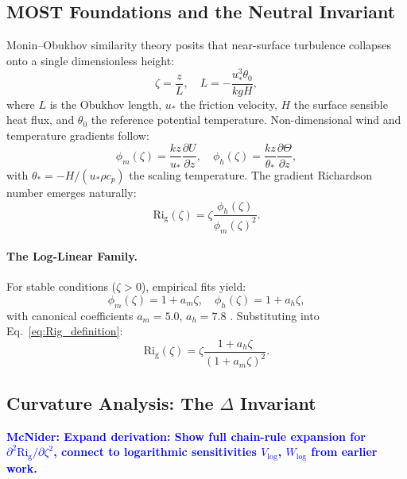 \documentclass[twocolumn,11pt]{article}
\newcommand{\Rig}{\text{Ri}_{\text{g}}}
\newcommand{\MCNIDER}[1]{\textcolor{blue}{\textbf{McNider: #1}}}
\begin{document}
\subsection{MOST Foundations and the Neutral Invariant}

Monin--Obukhov similarity theory \citep{monin1954} posits that near-surface turbulence collapses onto a single dimensionless height:
\begin{equation}
\zeta = \frac{z}{L}, \quad L = -\frac{u_*^3 \theta_0}{kg H},
\end{equation}
where $L$ is the Obukhov length, $u_*$ the friction velocity, $H$ the surface sensible heat flux, and $\theta_0$ the reference potential temperature. Non-dimensional wind and temperature gradients follow:
\begin{equation}
\phi_m(\zeta) = \frac{kz}{u_*}\frac{\partial U}{\partial z}, \quad \phi_h(\zeta) = \frac{kz}{\theta_*}\frac{\partial \Theta}{\partial z},
\end{equation}
with $\theta_* = -H/(u_* \rho c_p)$ the scaling temperature. The gradient Richardson number emerges naturally:
\begin{equation}
\Rig(\zeta) = \zeta \frac{\phi_h(\zeta)}{\phi_m(\zeta)^2}.
\label{eq:Rig_definition}
\end{equation}

\paragraph{The Log-Linear Family.} For stable conditions ($\zeta > 0$), empirical fits yield:
\begin{equation}
\phi_m(\zeta) = 1 + a_m \zeta, \quad \phi_h(\zeta) = 1 + a_h \zeta,
\label{eq:loglinear}
\end{equation}
with canonical coefficients $a_m = 5.0$, $a_h = 7.8$ \citep{businger1971}. Substituting into Eq.~\eqref{eq:Rig_definition}:
\begin{equation}
\Rig(\zeta) = \zeta \frac{1 + a_h \zeta}{(1 + a_m \zeta)^2}.
\label{eq:Rig_loglinear}
\end{equation}

\subsection{Curvature Analysis: The $\Delta$ Invariant}

\MCNIDER{Expand derivation: Show full chain-rule expansion for $\partial^2 \Rig / \partial \zeta^2$, connect to logarithmic sensitivities $V_{\log}$, $W_{\log}$ from earlier work.}
\end{document}
